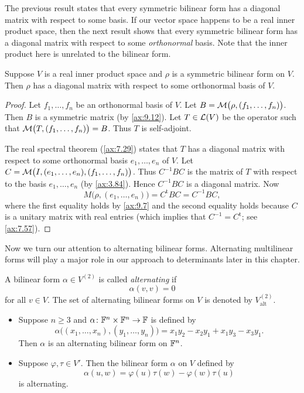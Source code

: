 The previous result states that every symmetric bilinear form has a diagonal
matrix with respect to some basis. If our vector space happens to be a real
inner product space, then the next result shows that every symmetric bilinear
form has a diagonal matrix with respect to some \emph{orthonormal} basis. Note
that the inner product here is unrelated to the bilinear form.

\begin{result}\label{ax:9.13}
Suppose $V$ is a real inner product space and $\rho$ is a symmetric bilinear
form on $V$. Then $\rho$ has a diagonal matrix with respect to some orthonormal
basis of $V$.
\end{result}

\begin{proof}
Let $f_1,\dots,f_n$ be an orthonormal basis of $V$. Let
$B=\mathcal{M}\bigl(\rho,(f_1,\dots,f_n)\bigr)$. Then $B$ is a symmetric matrix (by
\ref{ax:9.12}). Let $T\in\mathcal{L}(V)$ be the operator such that
$\mathcal{M}\bigl(T,\allowbreak(f_1,\dots,f_n)\bigr)=B$. Thus $T$ is self-adjoint.

The real spectral theorem (\ref{ax:7.29}) states that $T$ has a diagonal matrix
with respect to some orthonormal basis $e_1,\dots,e_n$ of $V$. Let
$C=\mathcal{M}\bigl(I,(e_1,\dots,e_n),(f_1,\dots,f_n)\bigr)$. Thus $C^{-1}BC$ is the
matrix of $T$ with respect to the basis $e_1,\dots,e_n$ (by \ref{ax:3.84}).
Hence $C^{-1}BC$ is a diagonal matrix. Now
\[ M\bigl(\rho,(e_1,\dots,e_n)\bigr) = C^{\mathrm{t}}BC = C^{-1}BC, \]
where the first equality holds by \ref{ax:9.7} and the second equality holds
because $C$ is a unitary matrix with real entries (which implies that
$C^{-1}=C^{\mathrm{t}}$; see \ref{ax:7.57}).
\end{proof}

Now we turn our attention to alternating bilinear forms. Alternating
multilinear forms will play a major role in our approach to determinants later
in this chapter.

\begin{definition}\label{ax:9.14}
A bilinear form $\alpha\in V^{(2)}$ is called \emph{alternating} if
\[ \alpha(v,v) = 0 \]
for all $v\in V$. The set of alternating bilinear forms on $V$ is denoted by
$V_{\mathrm{alt}}^{(2)}$.
\end{definition}

\begin{example}\label{ax:9.15}\leavevmode
\begin{itemize}
\item Suppose $n\ge3$ and $\alpha\colon\mathbb{F}^n\times\mathbb{F}^n\to\mathbb{F}$ is defined by
  \[ \alpha\bigl((x_1,\dots,x_n),(y_1,\dots,y_n)\bigr)
     = x_1y_2-x_2y_1+x_1y_3-x_3y_1. \]
  Then $\alpha$ is an alternating bilinear form on $\mathbb{F}^n$.
\item Suppose $\varphi,\tau\in V'$. Then the bilinear form $\alpha$ on $V$
  defined by
  \[ \alpha(u,w) = \varphi(u)\tau(w)-\varphi(w)\tau(u) \]
  is alternating.
\end{itemize}
\end{example}

